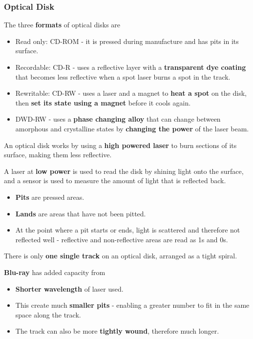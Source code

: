 \subsubsection*{Optical Disk}

The three \textbf{formats} of optical disks are
\begin{itemize}
    \item Read only: CD-ROM - it is pressed during manufacture and has pits in its surface.
    \item Recordable: CD-R - uses a reflective layer with a \textbf{transparent dye coating} that becomes less reflective when a spot laser burns a spot in the track.
    \item Rewritable: CD-RW - uses a laser and a magnet to \textbf{heat a spot} on the disk, then \textbf{set its state using a magnet} before it cools again.
    \item DWD-RW - uses a \textbf{phase changing alloy} that can change between amorphous and crystalline states by \textbf{changing the power} of the laser beam.
\end{itemize}

An optical disk works by using a \textbf{high powered laser} to burn sections of its surface, making them less reflective.

A laser at \textbf{low power} is used to read the disk by shining light onto the surface, and a sensor is used to measure the amount of light that is reflected back.

\begin{itemize}
    \item \textbf{Pits} are pressed areas.
    \item \textbf{Lands} are areas that have not been pitted.
    \item At the point where a pit starts or ends, light is scattered and therefore not reflected well - reflective and non-reflective areas are read as 1s and 0s.
\end{itemize}

There is only \textbf{one single track} on an optical disk, arranged as a tight spiral.

\textbf{Blu-ray} has added capacity from
\begin{itemize}
    \item \textbf{Shorter wavelength} of laser used.
    \item This create much \textbf{smaller pits} - enabling a greater number to fit in the same space along the track.
    \item The track can also be more \textbf{tightly wound}, therefore much longer.
\end{itemize}

